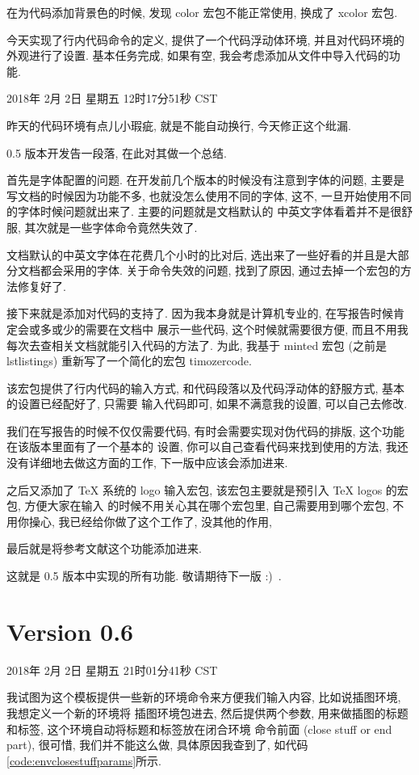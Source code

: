 \documentclass{cugrep}
\begin{document}
在为代码添加背景色的时候, 发现 color 宏包不能正常使用, 换成了 xcolor 宏包. 

今天实现了行内代码命令的定义, 提供了一个代码浮动体环境,
并且对代码环境的外观进行了设置. 基本任务完成, 如果有空,
我会考虑添加从文件中导入代码的功能.

2018年 2月 2日 星期五 12时17分51秒 CST

昨天的代码环境有点儿小瑕疵, 就是不能自动换行, 今天修正这个纰漏.

0.5 版本开发告一段落, 在此对其做一个总结.

首先是字体配置的问题. 在开发前几个版本的时候没有注意到字体的问题, 主要是写文档的时候因为功能不多,
也就没怎么使用不同的字体, 这不, 一旦开始使用不同的字体时候问题就出来了. 主要的问题就是文档默认的
中英文字体看着并不是很舒服, 其次就是一些字体命令竟然失效了. 

文档默认的中英文字体在花费几个小时的比对后, 选出来了一些好看的并且是大部分文档都会采用的字体. 
关于命令失效的问题, 找到了原因, 通过去掉一个宏包的方法修复好了.

接下来就是添加对代码的支持了. 因为我本身就是计算机专业的, 在写报告时候肯定会或多或少的需要在文档中
展示一些代码, 这个时候就需要很方便, 而且不用我每次去查相关文档就能引入代码的方法了. 为此, 我基于
minted 宏包 (之前是 lstlistings) 重新写了一个简化的宏包 timozercode. 

该宏包提供了行内代码的输入方式, 和代码段落以及代码浮动体的舒服方式, 基本的设置已经配好了, 只需要
输入代码即可, 如果不满意我的设置, 可以自己去修改.

我们在写报告的时候不仅仅需要代码, 有时会需要实现对伪代码的排版, 这个功能在该版本里面有了一个基本的
设置, 你可以自己查看代码来找到使用的方法, 我还没有详细地去做这方面的工作, 下一版中应该会添加进来. 

之后又添加了 \TeX{} 系统的 logo 输入宏包, 该宏包主要就是预引入 \TeX{} logos 的宏包, 方便大家在输入
的时候不用关心其在哪个宏包里, 自己需要用到哪个宏包, 不用你操心, 我已经给你做了这个工作了,
没其他的作用,

最后就是将参考文献这个功能添加进来. 

这就是 0.5 版本中实现的所有功能. 敬请期待下一版 :)~.

\section{Version 0.6}
\label{sec:version_0_6}

2018年 2月 2日 星期五 21时01分41秒 CST

我试图为这个模板提供一些新的环境命令来方便我们输入内容, 比如说插图环境, 我想定义一个新的环境将
插图环境包进去, 然后提供两个参数, 用来做插图的标题和标签, 这个环境自动将标题和标签放在闭合环境
命令前面 (close stuff or end part), 很可惜, 我们并不能这么做, 具体原因我查到了, 如代码\ref{code:envclosestuffparams}所示.
\end{document}
